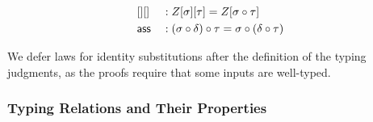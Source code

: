 \begin{lemma}
\begin{alignat*}{5}
  & [][] && : Z[\sigma][\tau] = Z[\sigma\circ\tau]
  \\
  & \mathsf{ass} && : (\sigma\circ \delta)\circ\tau = \sigma\circ (\delta\circ\tau)
\end{alignat*}
\end{lemma}

We defer laws for identity substitutions after the definition of the typing
judgments, as the proofs require that some inputs are well-typed.



\subsubsection{Typing Relations and Their Properties}

